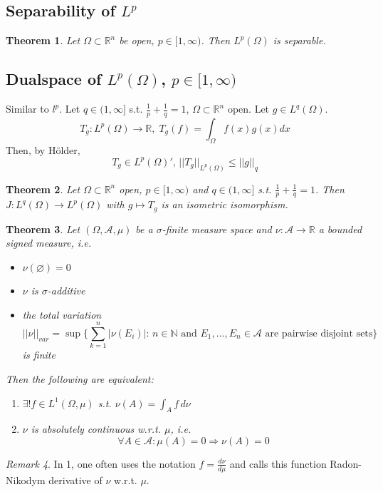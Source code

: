 \documentclass[a4paper, 12pt]{article}
\theoremstyle{plain}
\newtheorem{theorem}{Theorem}[subsection] %
\theoremstyle{definition}
\theoremstyle{lemma}
\theoremstyle{remark}
\newtheorem{remark}[theorem]{Remark}
\theoremstyle{corollary}
\theoremstyle{example}
\begin{document}
	\subsection{Separability of $L^p$}
	\begin{theorem}
		Let $\Omega \subset \mathbb{R}^n$ be open, $p \in [1,\infty)$. Then $L^p(\Omega)$ is separable.
	\end{theorem}
	\subsection{Dualspace of $L^p(\Omega)$, $p \in [1,\infty)$}
	Similar to $l^p$. Let $q \in (1,\infty]$ s.t. $\frac{1}{p}+\frac{1}{q} = 1$, $\Omega \subset \mathbb{R}^n$ open. Let $g \in L^q(\Omega)$. \[T_g:L^p(\Omega) \to \mathbb{R}, \; T_g(f) = \int_\Omega f(x)g(x)dx\]
	Then, by Hölder, \[T_g \in L^p(\Omega)', \,||T_g||_{L^p(\Omega)} \leq ||g||_q\]
	\begin{theorem}
		Let $\Omega \subset \mathbb{R}^n$ open, $p \in [1,\infty)$ and $q \in (1,\infty]$ s.t. $\frac{1}{p}+\frac{1}{q} = 1$. Then $J:L^q(\Omega) \to L^p(\Omega)$ with $g\mapsto T_g$ is an isometric isomorphism.
	\end{theorem}
	\begin{theorem}
		Let $(\Omega,\mathcal{A},\mu)$ be a $\sigma$-finite measure space and $\nu:\mathcal{A} \to \mathbb{R}$ a bounded signed measure, i.e. \begin{itemize}
			\item $\nu(\varnothing) = 0$
			\item $\nu$ is $\sigma$-additive
			\item the total variation $$||\nu||_{var} = \sup\{\sum_{k=1}^n \left|\nu(E_i)\right|: \, n \in \mathbb{N} \text{ and } E_1,...,E_n \in \mathcal{A} \text{ are pairwise disjoint sets}\}$$ is finite
		\end{itemize}
		Then the following are equivalent: \begin{enumerate}
			\item $\exists! f \in L^1(\Omega, \mu)$ s.t. $\nu(A) = \int_Af\,d\nu$
			\item $\nu$ is absolutely continuous w.r.t. $\mu$, i.e. \[\forall A \in \mathcal{A}: \mu(A) = 0 \Rightarrow \nu(A) = 0\]
		\end{enumerate}
	\end{theorem}
	\begin{remark}
		In 1, one often uses the notation $f = \frac{d\nu}{d\mu}$ and calls this function Radon-Nikodym derivative of $\nu$ w.r.t. $\mu$. 
	\end{remark}
\end{document}
